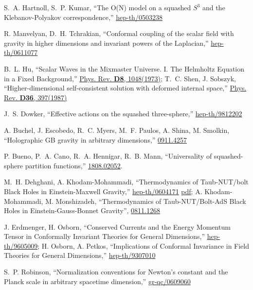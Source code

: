 \documentclass[12pt, a4paper]{article}
\numberwithin{equation}{section}
\begin{document}
\begin{thebibliography}{10}
S.~A. Hartnoll, S.~P. Kumar, ``{The O(N) model on a squashed $S^3$ and the Klebanov-Polyakov correspondence},'' \href{https://arxiv.org/abs/hep-th/0503238}{hep-th/0503238}

R. Manvelyan, D.~H. Tchrakian, ``{Conformal coupling of the scalar field with gravity in higher dimensions and invariant powers of the Laplacian},'' \href{https://arxiv.org/abs/hep-th/0611077}{hep-th/0611077}

B.~L. Hu, ``{Scalar Waves in the Mixmaster Universe. I. The Helmholtz Equation in a Fixed Background},'' \href{https://journals.aps.org/prd/abstract/10.1103/PhysRevD.8.1048}{Phys. Rev. \textbf{D8}, 1048(1973)}; T.~C. Shen, J. Sobszyk, ``{Higher-dimensional self-consistent solution with deformed internal space},'' \href{https://journals.aps.org/prd/abstract/10.1103/PhysRevD.36.397}{Phys. Rev. \textbf{D36}, 397(1987)}

J.~S. Dowker, ``{Effective actions on the squashed three-sphere},'' \href{https://arxiv.org/abs/hep-th/9812202}{hep-th/9812202}

A. Buchel, J. Escobedo, R.~C. Myers, M.~F. Paulos, A. Shina, M. Smolkin, ``{Holographic GB gravity in arbitrary dimensions},'' \href{https://arxiv.org/pdf/0911.4257.pdf}{0911.4257}

P. Bueno, P.~A. Cano, R.~A. Hennigar, R.~B. Mann, ``{Universality of squashed-sphere partition functions},'' \href{https://arxiv.org/pdf/1808.02052.pdf}{1808.02052}.

M.~H. Dehghani, A. Khodam-Mohammadi, ``{Thermodynamics of Taub-NUT/bolt Black Holes in Einstein-Maxwell Gravity},'' \href{https://arxiv.org/abs/hep-th/0604171}{hep-th/0604171} \href{https://arxiv.org/pdf/hep-th/0604171.pdf}{pdf}; A. Khodam-Mohammadi, M. Monshizadeh, ``{Thermodynamics of Taub-NUT/Bolt-AdS Black Holes in Einstein-Gauss-Bonnet Gravity}'', \href{https://arxiv.org/pdf/0811.1268.pdf}{0811.1268}

J. Erdmenger, H. Osborn, ``{Conserved Currents and the Energy Momentum Tensor in Conformally Invariant Theories for General Dimensions},'' \href{https://arxiv.org/pdf/hep-th/9605009.pdf}{hep-th/9605009}; H. Osborn, A. Petkos, ``{Implications of Conformal Invariance in Field Theories for General Dimensions},'' \href{https://arxiv.org/pdf/hep-th/9307010.pdf}{hep-th/9307010}

S.~P. Robinson, ``{Normalization conventions for Newton's constant and the Planck scale in arbitrary spacetime dimension},'' \href{https://arxiv.org/pdf/gr-qc/0609060.pdf}{gr-qc/0609060}


\end{thebibliography}
\end{document}
